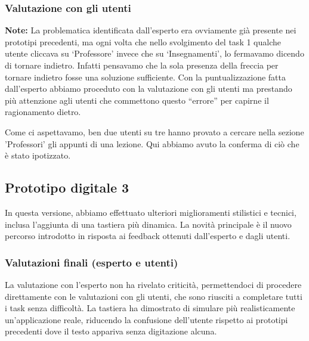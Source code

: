 \subsubsection{Valutazione con gli utenti}
\textbf{Note:} La problematica identificata dall’esperto era ovviamente già presente nei prototipi precedenti, ma ogni volta che nello svolgimento del task 1 qualche utente cliccava su ‘Professore’ invece che su ‘Insegnamenti’, lo fermavamo dicendo di tornare indietro.
Infatti pensavamo che la sola presenza della freccia per tornare indietro fosse una soluzione sufficiente. Con la puntualizzazione fatta dall’esperto abbiamo proceduto con la valutazione con gli utenti ma prestando più attenzione agli utenti che commettono questo “errore” per capirne il ragionamento dietro.

Come ci aspettavamo, ben due utenti su tre hanno provato a cercare nella sezione 'Professori' gli appunti di una lezione. Qui abbiamo avuto la conferma di ciò che è stato ipotizzato.

\subsection{Prototipo digitale 3}
In questa versione, abbiamo effettuato ulteriori miglioramenti stilistici e tecnici, inclusa l’aggiunta di una tastiera più dinamica.
La novità principale è il nuovo percorso introdotto in risposta ai feedback ottenuti dall’esperto e dagli utenti.

\subsubsection{Valutazioni finali (esperto e utenti)}
La valutazione con l’esperto non ha rivelato criticità, permettendoci di procedere direttamente con le valutazioni con gli utenti, che sono riusciti a completare tutti i task senza difficoltà.
La tastiera ha dimostrato di simulare più realisticamente un’applicazione reale, riducendo la confusione dell’utente rispetto ai prototipi precedenti dove il testo appariva senza digitazione alcuna.

